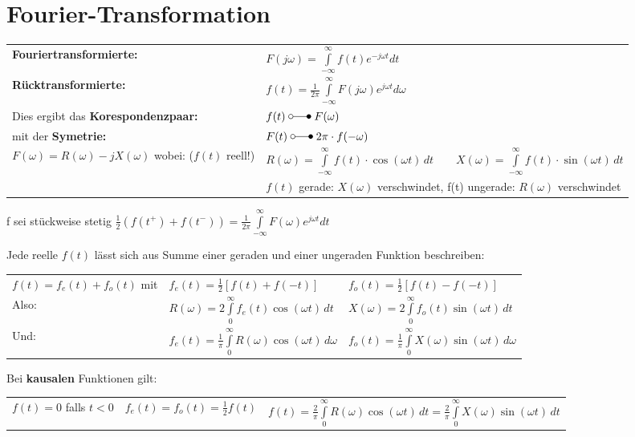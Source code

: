\section{Fourier-Transformation}
\begin{tabular}{|p{6cm} l|} \hline
	\textbf{Fouriertransformierte:} &
	$F(j\omega) = \int\limits_{-\infty}^{\infty} f(t)e^{-j\omega t}dt$ \\
	\textbf{Rücktransformierte:} &
	$f(t) = \frac{1}{2\pi}\int\limits_{-\infty}^{\infty}F(j\omega)e^{j\omega t}d\omega$ \\ \hline

Dies ergibt das \textbf{Korespondenzpaar:} & $f(t) \; \laplace \; F(\omega)$ \\
mit der \textbf{Symetrie:} & $F(t) \; \laplace \; 2\pi \cdot f(-\omega)$ \\

$F(\omega) = R(\omega) -jX(\omega)$ wobei: ($f(t)$ reell!) &
$R(\omega) = \int\limits_{-\infty}^\infty f(t)\cdot \cos(\omega t)\,dt \quad\quad X(\omega) =
\int\limits_{-\infty}^\infty f(t)\cdot \sin(\omega t)\,dt$
\\
&$f(t)$ gerade: $X(\omega)$ verschwindet, f(t) ungerade: $R(\omega)$ verschwindet \\
\hline
\end{tabular}

f sei stückweise stetig $\frac{1}{2}(f(t^+) + f(t^-)) = \frac{1}{2\pi} \int\limits_{-\infty}^{\infty}F(\omega)e^{j\omega t} dt$

Jede reelle $f(t)$ lässt sich aus Summe einer geraden und einer ungeraden Funktion beschreiben:\\
\begin{tabular}{lll}
$f(t) = f_e(t) + f_o(t)$ mit & $f_e(t) = \frac{1}{2}[f(t) + f(-t)]$ & $f_o(t) = \frac{1}{2}[f(t) - f(-t)]$ \\

Also: & $R(\omega) = 2 \int\limits_0^\infty f_e(t) \cos(\omega t)\,dt$ & $X(\omega) = 2 \int\limits_0^\infty
f_o(t) \sin(\omega t)\,dt$ \\

Und: & $f_e(t) = \frac{1}{\pi}\int\limits_0^\infty R(\omega)\cos(\omega t)\,d\omega$ & 
$f_o(t) = \frac{1}{\pi}\int\limits_0^\infty X(\omega)\sin(\omega t)\,d\omega$ \\
\end{tabular}

Bei \textbf{kausalen} Funktionen gilt:\\
\begin{tabular}{c c c}
	$f(t) = 0$ falls $t<0$ & 
	$f_e(t) = f_o(t) = \frac{1}{2}f(t)$ &
	$f(t) = \frac{2}{\pi}\int\limits_0^\infty R(\omega) \cos(\omega t)\,dt = \frac{2}{\pi}\int\limits_0^\infty X(\omega) \sin(\omega t)\,dt$
\end{tabular}
	

